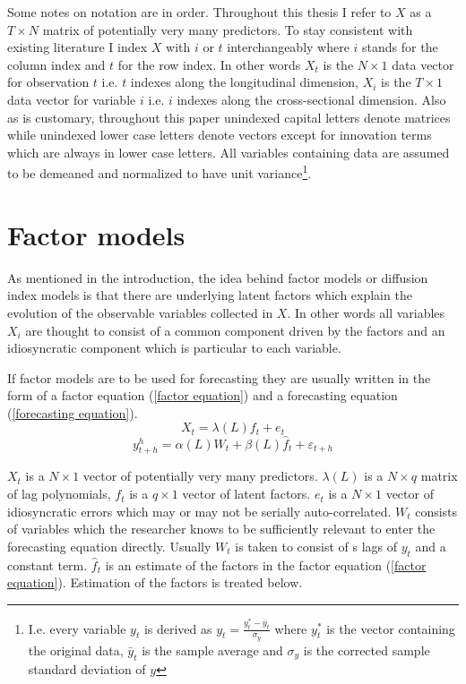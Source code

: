 \documentclass[12pt]{article}
\begin{document}
Some notes on notation are in order. Throughout this thesis I refer to $X$ as a $T \times N$ matrix of potentially very many predictors. To stay consistent with existing literature I index $X$ with $i$ or $t$ interchangeably where $i$ stands for the column index and $t$ for the row index. In other words $X_t$ is the $N \times 1$ data vector for observation $t$ i.e. $t$ indexes along the longitudinal dimension, $X_i$ is the $T \times 1$ data vector for variable $i$ i.e. $i$ indexes along the cross-sectional dimension. Also as is customary, throughout this paper unindexed capital letters denote matrices while unindexed lower case letters denote vectors except for innovation terms which are always in lower case letters. All variables containing data are assumed to be demeaned and normalized to have unit variance\footnote{I.e. every variable $y_t$ is derived as $y_t = \frac{y_t^* - \bar y_t}{\sigma_{y}}$ where $y_t^*$ is the vector containing the original data, $\bar y_t$ is the sample average and $\sigma_{y}$ is the corrected sample standard deviation of $y$}.

\section{Factor models}
As mentioned in the introduction, the idea behind factor models or diffusion index models is that there are underlying latent factors which explain the evolution of the observable variables collected in $X$. In other words all variables $X_i$ are thought to consist of a common component driven by the factors and an idiosyncratic component which is particular to each variable.

If factor models are to be used for forecasting they are usually written in the form of a factor equation (\ref{factor equation}) and a forecasting equation (\ref{forecasting equation}).
\begin{equation}
	\label{factor equation}
	X_t = \lambda(L) f_t + e_t
\end{equation}
\begin{equation}
	\label{forecasting equation}
	y^h_{t+h} = \alpha(L) W_t + \beta(L) \hat f_t + \varepsilon_{t+h}
\end{equation}
	
$X_t$ is a $N \times 1$ vector of potentially very many predictors. $\lambda(L)$ is a $N \times q$ matrix of lag polynomials, $f_t$ is a $q \times 1$ vector of latent factors. $e_t$ is a $N \times 1$ vector of idiosyncratic errors which may or may not be serially auto-correlated. $W_t$ consists of variables which the researcher knows to be sufficiently relevant to enter the forecasting equation directly. Usually $W_t$ is taken to consist of s lags of $y_t$ and a constant term. $\hat f_t$ is an estimate of the factors in the factor equation (\ref{factor equation}). Estimation of the factors is treated below.
\end{document}
